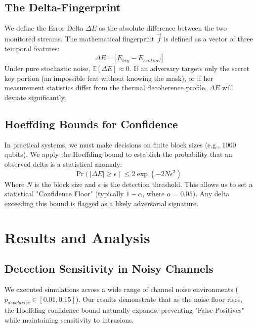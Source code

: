 \documentclass[journal,onecolumn,12pt,draftclsnofoot]{IEEEtran}
\begin{document}
\subsection{The Delta-Fingerprint}
We define the Error Delta $\Delta E$ as the absolute difference between the two monitored streams. The mathematical fingerprint $\vec{f}$ is defined as a vector of three temporal features:
\begin{equation}
    \Delta E = |E_{key} - E_{sentinel}|
\end{equation}
Under pure stochastic noise, $\mathbb{E}[\Delta E] \approx 0$. If an adversary targets only the secret key portion (an impossible feat without knowing the mask), or if her measurement statistics differ from the thermal decoherence profile, $\Delta E$ will deviate significantly.

\subsection{Hoeffding Bounds for Confidence}
In practical systems, we must make decisions on finite block sizes (e.g., 1000 qubits). We apply the Hoeffding bound to establish the probability that an observed delta is a statistical anomaly:
\begin{equation}
    \text{Pr}(|\Delta E| \ge \epsilon) \le 2\exp(-2N\epsilon^2)
\end{equation}
Where $N$ is the block size and $\epsilon$ is the detection threshold. This allows us to set a statistical "Confidence Floor" (typically $1-\alpha$, where $\alpha=0.05$). Any delta exceeding this bound is flagged as a likely adversarial signature.

\newpage

\section{Results and Analysis}

\subsection{Detection Sensitivity in Noisy Channels}
We executed simulations across a wide range of channel noise environments ($p_{depolarize} \in [0.01, 0.15]$). Our results demonstrate that as the noise floor rises, the Hoeffding confidence bound naturally expands, preventing "False Positives" while maintaining sensitivity to intrusions.
\end{document}
